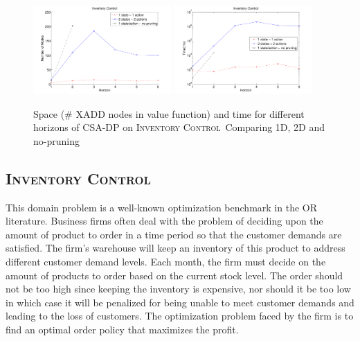 \documentclass[letterpaper]{article}
\newcommand{\InventoryControl}{\textsc{Inventory Control}}
\begin{document}
\begin{figure}[t]
\centering
\includegraphics[width=0.47\textwidth]{Figures1/space1-3.pdf}
\hspace{5mm}
\includegraphics[width=0.47\textwidth]{Figures1/time1-3.pdf}
\caption{%
Space (\# XADD nodes in value function) and
time for different horizons of CSA-DP on \InventoryControl\ 
Comparing 1D, 2D and no-pruning}
\label{fig:invC}
\end{figure}

\subsection{\InventoryControl} 
This domain problem is a well-known optimization benchmark in the OR literature. Business firms often deal with the problem of deciding  upon the amount of product to order in a time period so that the customer demands are satisfied. The firm's warehouse will keep an inventory of this product to address different customer demand levels. Each month, the firm must decide on the amount of products to order based on the current stock level.
The order should not be too high since keeping the inventory is expensive, nor should it be too low in which case it will be penalized for being unable to meet customer demands and leading to the loss of customers. The optimization problem faced by the firm is to find an optimal order policy that maximizes the profit.~\cite{Mahootchi2009}
\end{document}
